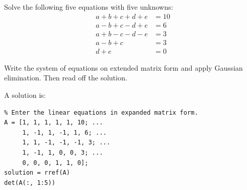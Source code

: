 \begin{ex}
Solve the following five equations with five unknowns:
\begin{align*}
a + b + c + d + e & = 10 \\
a - b + c - d + e & = 6 \\
a + b - c - d - e & = 3 \\
a - b + c & = 3 \\
d + e & = 0
\end{align*}
\begin{hint}
Write the system of equations on extended matrix form
and apply Gaussian elimination.
Then read off the solution.
\end{hint}
\begin{sol}
A solution is:
\begin{lstlisting}
% Enter the linear equations in expanded matrix form.
A = [1, 1, 1, 1, 1, 10; ...
     1, -1, 1, -1, 1, 6; ...
     1, 1, -1, -1, -1, 3; ...
     1, -1, 1, 0, 0, 3; ...
     0, 0, 0, 1, 1, 0];
solution = rref(A)
det(A(:, 1:5))
\end{lstlisting}
\end{sol}
\end{ex}


